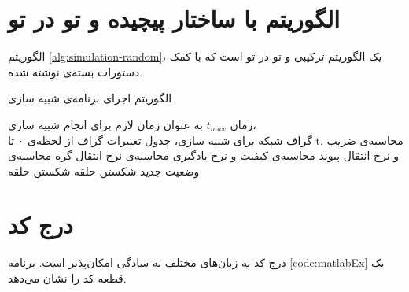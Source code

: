 \section{الگوریتم با ساختار پیچیده و تو در تو}
الگوریتم \ref{alg:simulation-random}، یک الگوریتم ترکیبی و تو در تو است که با کمک دستورات بسته‌ی  نوشته شده.

\begin{algorithm}[ht]
	\onehalfspacing
	\caption{الگوریتم اجرای برنامه‌ی شبیه سازی}
	\label{alg:simulation-random}
	\begin{algorithmic}[1]
		\REQUIRE زمان $t_{max}$ به عنوان زمان لازم برای انجام شبیه سازی،\\
		\REQUIRE  گراف شبکه برای شبیه سازی،
		\ENSURE جدول تغییرات گراف از لحظه‌ی ۰ تا t.
				\STATE محاسبه‌ی ضریب و نرخ انتقال پیوند
				\STATE محاسبه‌ی کیفیت و نرخ یادگیری
			\ENDFOR
				\STATE محاسبه‌ی نرخ انتقال گره
				\STATE محاسبه‌ی وضعیت جدید
			\ENDFOR
				\STATE شکستن حلقه
				\STATE شکستن حلقه
			\ENDIF
		\ENDFOR
	\end{algorithmic}
\end{algorithm}

\section{درج کد}
درج کد به زبان‌های مختلف به سادگی امکان‌پذیر است. برنامه
\ref{code:matlabEx}
یک قطعه کد
را نشان می‌دهد.
\singlespacing
\begin{figure}
	\begin{LTR}
		
	\end{LTR}
\end{figure}
\doublespacing

